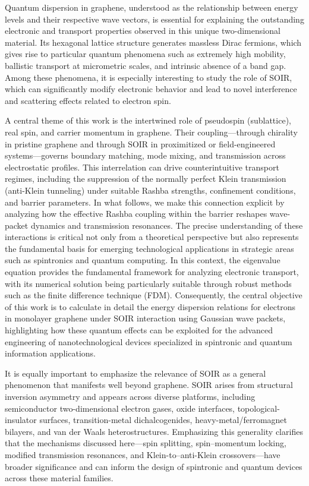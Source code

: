 Quantum dispersion in graphene, understood as the relationship between energy levels and their respective wave vectors, is essential for explaining the outstanding electronic and transport properties observed in this unique two-dimensional material.
Its hexagonal lattice structure generates massless Dirac fermions, which gives rise to particular quantum phenomena such as extremely high mobility, ballistic transport at micrometric scales, and intrinsic absence of a band gap\cite{Geimk2007}.
Among these phenomena, it is especially interesting to study the role of SOIR, which can significantly modify electronic behavior and lead to novel interference and scattering effects related to electron spin.

A central theme of this work is the intertwined role of pseudospin (sublattice), real spin, and carrier momentum in graphene.
Their coupling—through chirality in pristine graphene and through SOIR in proximitized or field-engineered systems—governs boundary matching, mode mixing, and transmission across electrostatic profiles.
This interrelation can drive counterintuitive transport regimes, including the suppression of the normally perfect Klein transmission (anti-Klein tunneling) under suitable Rashba strengths, confinement conditions, and barrier parameters\cite{Young2009, DellAnnaJPhysCondMatt2018}.
In what follows, we make this connection explicit by analyzing how the effective Rashba coupling within the barrier reshapes wave-packet dynamics and transmission resonances.
The precise understanding of these interactions is critical not only from a theoretical perspective but also represents the fundamental basis for emerging technological applications in strategic areas such as spintronics and quantum computing\cite{WeizheMaterials2017, AvsarNatCommun2014, LiuNano2023}.
In this context, the eigenvalue equation provides the fundamental framework for analyzing electronic transport, with its numerical solution being particularly suitable through robust methods such as the finite difference technique (FDM)\cite{Carrillo2015}.
Consequently, the central objective of this work is to calculate in detail the energy dispersion relations for electrons in monolayer graphene under SOIR interaction using Gaussian wave packets, highlighting how these quantum effects can be exploited for the advanced engineering of nanotechnological devices specialized in spintronic and quantum information applications.

It is equally important to emphasize the relevance of SOIR as a general phenomenon that manifests well beyond graphene.
SOIR arises from structural inversion asymmetry and appears across diverse platforms, including semiconductor two-dimensional electron gases, oxide interfaces, topological-insulator surfaces, transition-metal dichalcogenides, heavy-metal/ferromagnet bilayers, and van der Waals heterostructures.
Emphasizing this generality clarifies that the mechanisms discussed here—spin splitting, spin–momentum locking, modified transmission resonances, and Klein-to–anti-Klein crossovers—have broader significance and can inform the design of spintronic and quantum devices across these material families\cite{ManchonNatureMater2015}.

